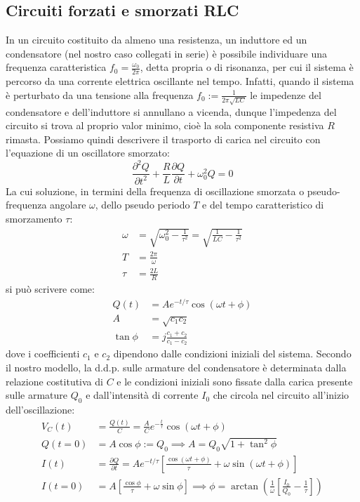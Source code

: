 \documentclass{article}[a4paper, oneside, 11pt]
\begin{document}
\subsection{Circuiti forzati e smorzati RLC}
In un circuito costituito da almeno una resistenza, un induttore ed un
condensatore (nel nostro caso collegati in serie) è possibile individuare una
frequenza caratteristica $f_0 = \frac{\omega_0}{2\pi}$, detta propria o di
risonanza, per cui il sistema è percorso da una corrente elettrica oscillante
nel tempo.
Infatti, quando il sistema è perturbato da una tensione alla frequenza
$f_0 := \frac{1}{2\pi \sqrt{LC}}$ 
le impedenze del condensatore e dell'induttore si annullano a vicenda, dunque
l'impedenza del circuito si trova al proprio valor minimo, cioè la sola
componente resistiva $R$ rimasta. Possiamo quindi descrivere il trasporto di
carica nel circuito con l'equazione di un oscillatore smorzato:
\begin{equation}\label{eq: RLC}
	\frac{\partial^2 Q}{\partial t^2} + \frac{R}{L}\frac{\partial Q}{\partial t}
	+ \omega_0^2 Q = 0   
\end{equation}
La cui soluzione, in termini della frequenza di oscillazione smorzata o
pseudo-frequenza angolare $\omega$, dello pseudo periodo $T$ e del tempo
caratteristico di smorzamento $\tau$:
\begin{align*}
	\omega &= \sqrt{\omega_0^2 - \frac{1}{\tau^2}} =
	\sqrt{\frac{1}{LC} - \frac{1}{\tau^2}} \\
	T &= \frac{2\pi}{\omega} \\
	\tau &= \frac{2L}{R}
\end{align*}
si può scrivere come:
\begin{align}\label{aln: Q(t)}
	Q(t) &= A e^{-t/\tau} \cos{(\omega t + \phi)} \\
	A &= \sqrt{c_1 c_2} \\
	\tan{\phi} &= j\frac{c_1 + c_2}{c_1 - c_2}
\end{align}
dove i coefficienti $c_1$ e $c_2$ dipendono dalle condizioni iniziali del
sistema. Secondo il nostro modello, la d.d.p. sulle armature del condensatore
è determinata dalla relazione costitutiva di $C$ e le condizioni iniziali
sono fissate dalla carica presente sulle armature $Q_0$ e dall'intensità
di corrente $I_0$ che circola nel circuito all'inizio dell'oscillazione:
\begin{align}\label{aln: Vc(t)}
	V_C(t) &= \frac{Q(t)}{C} = \frac{A}{C}e^{-\frac{t}{\tau}}\cos(\omega t + \phi)\\
	Q(t = 0) &= A\cos{\phi} := Q_0 \implies A = Q_0 \sqrt{1 + \tan^2{\phi}} \\
	I(t) &= \frac{\partial Q}{\partial t} = A e^{-t/\tau} \left[
	\frac{\cos{(\omega t + \phi)}}{\tau} + \omega\sin{(\omega t + \phi)} \right] \\
	I(t = 0) &= A \left[ \frac{\cos{\phi}}{\tau} + \omega\sin{\phi} \right] 
	\implies \phi = \arctan{\left( \frac{1}{\omega}\left[
	\frac{I_0}{Q_0} - \frac{1}{\tau}\right] \right) }
\end{align}
\end{document}
